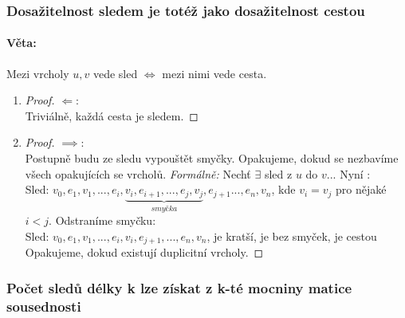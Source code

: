 \documentclass[10pt,a4paper]{article}
\begin{document}
\subsubsection{Dosažitelnost sledem je totéž jako dosažitelnost cestou}
\paragraph*{Věta: } Mezi vrcholy $u,v$ vede sled $\iff$ mezi nimi vede cesta.
\begin{enumerate}
    \item \begin{proof} $\Longleftarrow$:\\
        Triviálně, každá cesta je sledem.
        \end{proof}
    \item \begin{proof} $\implies$:\\
            Postupně budu ze sledu vypouštět smyčky. Opakujeme, dokud se nezbavíme všech opakujících se vrcholů.
            \textit{Formálně:} Nechť $\exists$ sled z $u$ do $v$... Nyní :\\
            Sled: $v_0, e_1, v_1, ..., e_i, \underbrace{v_i, e_{i+1}, ..., e_j, v_j}_{\textit{smyčka}}, e_{j+1} ... , e_n, v_n$, kde $v_i = v_j$ pro nějaké $i<j$. Odstraníme smyčku:\\
            Sled: $v_0, e_1, v_1,  ..., e_i, v_i, e_{j+1}, ..., e_n, v_n$, je kratší, je bez smyček, je cestou\\
            Opakujeme, dokud existují duplicitní vrcholy.
        \end{proof}
\end{enumerate}

\subsubsection{Počet sledů délky k lze získat z k-té mocniny matice sousednosti}
\end{document}
